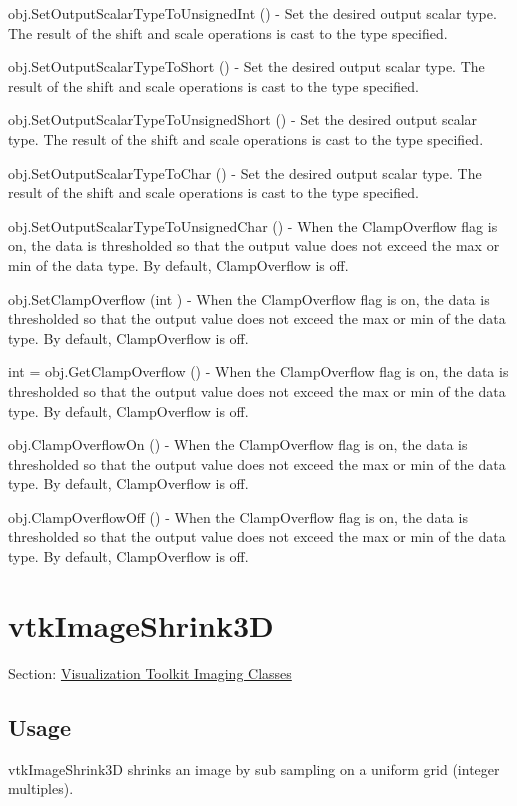 \begin{DoxyItemize}
\item {\ttfamily obj.\-Set\-Output\-Scalar\-Type\-To\-Unsigned\-Int ()} -\/ Set the desired output scalar type. The result of the shift and scale operations is cast to the type specified.  
\item {\ttfamily obj.\-Set\-Output\-Scalar\-Type\-To\-Short ()} -\/ Set the desired output scalar type. The result of the shift and scale operations is cast to the type specified.  
\item {\ttfamily obj.\-Set\-Output\-Scalar\-Type\-To\-Unsigned\-Short ()} -\/ Set the desired output scalar type. The result of the shift and scale operations is cast to the type specified.  
\item {\ttfamily obj.\-Set\-Output\-Scalar\-Type\-To\-Char ()} -\/ Set the desired output scalar type. The result of the shift and scale operations is cast to the type specified.  
\item {\ttfamily obj.\-Set\-Output\-Scalar\-Type\-To\-Unsigned\-Char ()} -\/ When the Clamp\-Overflow flag is on, the data is thresholded so that the output value does not exceed the max or min of the data type. By default, Clamp\-Overflow is off.  
\item {\ttfamily obj.\-Set\-Clamp\-Overflow (int )} -\/ When the Clamp\-Overflow flag is on, the data is thresholded so that the output value does not exceed the max or min of the data type. By default, Clamp\-Overflow is off.  
\item {\ttfamily int = obj.\-Get\-Clamp\-Overflow ()} -\/ When the Clamp\-Overflow flag is on, the data is thresholded so that the output value does not exceed the max or min of the data type. By default, Clamp\-Overflow is off.  
\item {\ttfamily obj.\-Clamp\-Overflow\-On ()} -\/ When the Clamp\-Overflow flag is on, the data is thresholded so that the output value does not exceed the max or min of the data type. By default, Clamp\-Overflow is off.  
\item {\ttfamily obj.\-Clamp\-Overflow\-Off ()} -\/ When the Clamp\-Overflow flag is on, the data is thresholded so that the output value does not exceed the max or min of the data type. By default, Clamp\-Overflow is off.  
\end{DoxyItemize}\hypertarget{vtkimaging_vtkimageshrink3d}{}\section{vtk\-Image\-Shrink3\-D}\label{vtkimaging_vtkimageshrink3d}
Section\-: \hyperlink{sec_vtkimaging}{Visualization Toolkit Imaging Classes} \hypertarget{vtkwidgets_vtkxyplotwidget_Usage}{}\subsection{Usage}\label{vtkwidgets_vtkxyplotwidget_Usage}
vtk\-Image\-Shrink3\-D shrinks an image by sub sampling on a uniform grid (integer multiples).

